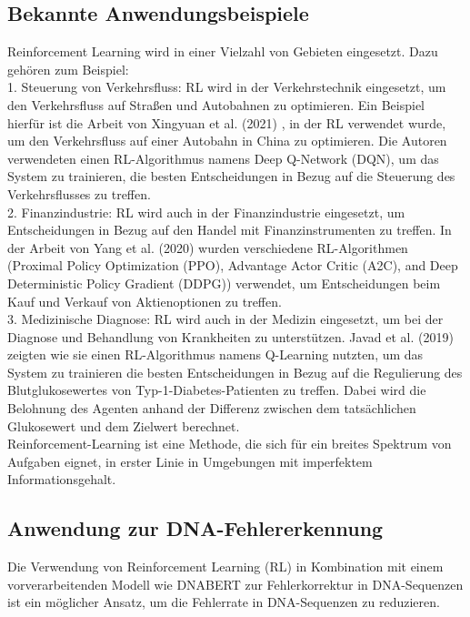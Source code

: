 \documentclass[oneside,bibliography=totocnumbered,BCOR=5mm]{scrbook}%
\theoremstyle{definition}
\theoremstyle{definition}
\theoremstyle{definition}
\theoremstyle{definition}
\theoremstyle{definition}
\theoremstyle{definition}
\begin{document}
\subsection{Bekannte Anwendungsbeispiele}


Reinforcement Learning wird in einer Vielzahl von Gebieten eingesetzt. 
Dazu gehören zum Beispiel:\\


1. Steuerung von Verkehrsfluss: RL wird in der Verkehrstechnik eingesetzt, um den Verkehrsfluss auf 
Straßen und Autobahnen zu optimieren. 
Ein Beispiel hierfür ist die Arbeit von Xingyuan et al. (2021) \autocite{RLTrafficControl}, in der RL verwendet wurde, 
um den Verkehrsfluss auf einer Autobahn in China zu optimieren. 
Die Autoren verwendeten einen RL-Algorithmus namens Deep Q-Network (DQN), um das System zu trainieren, 
die besten Entscheidungen in Bezug auf die Steuerung des Verkehrsflusses zu treffen.\\


2. Finanzindustrie: RL wird auch in der Finanzindustrie eingesetzt, um Entscheidungen in Bezug 
auf den Handel mit Finanzinstrumenten zu treffen. 
In der Arbeit von Yang et al. (2020) \autocite{RLStock} wurden verschiedene RL-Algorithmen (Proximal Policy Optimization (PPO), 
Advantage Actor Critic (A2C), and Deep Deterministic Policy Gradient (DDPG)) verwendet, 
um Entscheidungen beim Kauf und Verkauf von Aktienoptionen zu treffen.\\


3. Medizinische Diagnose: RL wird auch in der Medizin eingesetzt, um bei der Diagnose und Behandlung von Krankheiten zu unterstützen. 
Javad et al. (2019) \autocite{RLDiabetes} zeigten wie sie einen RL-Algorithmus namens Q-Learning nutzten, 
um das System zu trainieren die besten Entscheidungen in Bezug auf die Regulierung des Blutglukosewertes von 
Typ-1-Diabetes-Patienten zu treffen. Dabei wird die Belohnung des Agenten anhand der Differenz zwischen dem
tatsächlichen Glukosewert und dem Zielwert berechnet.\\


Reinforcement-Learning ist eine Methode, die sich für ein breites Spektrum von
Aufgaben eignet, in erster Linie in Umgebungen mit imperfektem Informationsgehalt. 


\subsection{Anwendung zur DNA-Fehlererkennung}
Die Verwendung von Reinforcement Learning (RL) in Kombination mit einem vorverarbeitenden Modell wie DNABERT 
zur Fehlerkorrektur in DNA-Sequenzen ist ein möglicher Ansatz, um die Fehlerrate in DNA-Sequenzen zu reduzieren. \\
\end{document}
